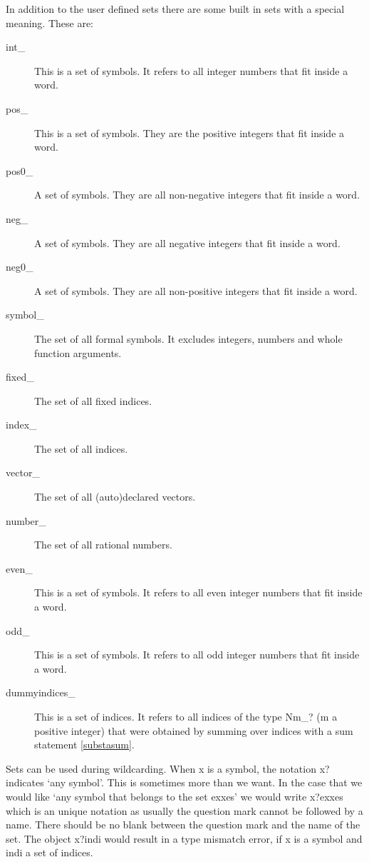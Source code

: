 In addition to the user defined sets there are some built in sets with a 
special meaning. These are:
\begin{description}
\item[int\_] This is a set of symbols. It refers to all integer numbers 
	that fit inside a {\FORM} word.
\item[pos\_] This is a set of symbols. They are the positive integers that 
    fit inside a {\FORM} word.
\item[pos0\_] A set of symbols. They are all non-negative integers that 
fit inside a {\FORM} word.
\item[neg\_]  A set of symbols. They are all negative integers that 
fit inside a {\FORM} word.
\item[neg0\_]  A set of symbols. They are all non-positive integers that 
fit inside a {\FORM} word.
\item[symbol\_] The set of all formal symbols. It excludes integers, 
    numbers and whole function arguments.
\item[fixed\_] The set of all fixed indices.
\item[index\_] The set of all indices.
\item[vector\_] The set of all (auto)declared vectors.
\item[number\_] The set of all rational numbers.
\item[even\_] This is a set of symbols. It refers to all even integer numbers 
	that fit inside a {\FORM} word.
\item[odd\_] This is a set of symbols. It refers to all odd integer numbers 
	that fit inside a {\FORM} word.
\item[dummyindices\_] This is a set of indices. It refers to all 
	indices of the type Nm\_? (m a positive integer) that were obtained by
    summing over indices with a sum statement \ref{substasum}.
\end{description}

Sets can be used during wildcarding. When x is a symbol, 
the notation x? indicates `any symbol'. This is sometimes more than we 
want. In the case that we would like `any symbol that belongs to the set 
exxes' we would write x?exxes which is an unique notation as usually 
the question mark cannot be followed by a name. There should be no blank 
between the question mark and the name of the set. The object x?indi 
would result in a type mismatch error, if x is a symbol and indi a set of 
indices. 

